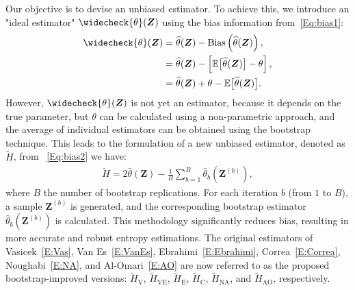 Our objective is to devise an unbiased estimator. To achieve this, we introduce an "ideal estimator" \(\widecheck{\theta}(\bm{Z})\) using the bias information from~\eqref{Eq:bias1}:
\begin{align}
\label{Eq:bias2}
\widecheck{\theta}(\bm{Z}) &= \widehat{\theta}(\bm{Z}) - \bias\left(\widehat{\theta}(\bm{Z})\right),\nonumber\\
&=\widehat{\theta}(\bm{Z})-\left[\mathbb{E}\big[\widehat{\theta}(\bm{Z})\big] - \theta\right],\nonumber\\
&=\widehat{\theta}(\bm{Z})+\theta-\mathbb{E}\big[\widehat{\theta}(\bm{Z})\big].
\end{align}
However, \(\widecheck{\theta}(\bm{Z})\) is not yet an estimator, because it depends on the true parameter, but \(\theta\) can be calculated using a non-parametric approach, and the average of individual estimators can be obtained using the bootstrap technique. This leads to the formulation of a new unbiased estimator, denoted as \(\widetilde{H}\), from ~\eqref{Eq:bias2} we have:
\begin{align}
\label{Eq:bias3}
\widetilde{H}%
= 2\widehat{\theta}(\bm{Z}) - \frac{1}{B}\sum_{b=1}^B \widehat{\theta}_b(\bm{Z}^{(b)}),
\end{align} where \(B\) the number of bootstrap replications. For each iteration \(b\) (from \(1\) to \(B\)), a sample \(\bm{Z}^{(b)}\) is generated, and the corresponding bootstrap estimator \(\widehat{\theta}_b(\bm{Z}^{(b)})\) is calculated. 
This methodology significantly reduces bias, resulting in more accurate and robust entropy estimations. The original estimators of Vasicek~\eqref{E:Vas}, Van Es~\eqref{E:VanEs}, Ebrahimi~\eqref{E:Ebrahimi}, Correa~\eqref{E:Correa}, Noughabi~\eqref{E:NA}, and Al-Omari~\eqref{E:AO}  are now referred to as the proposed bootstrap-improved versions:
\(\widetilde{H}_{\text{V}}\),
\(\widetilde{H}_{\text{VE}}\), 
\(\widetilde{H}_{\text{E}}\),
\(\widetilde{H}_{\text{C}}\),
\(\widetilde{H}_{\text{NA}}\), and 
\(\widetilde{H}_{\text{AO}}\),
respectively.

